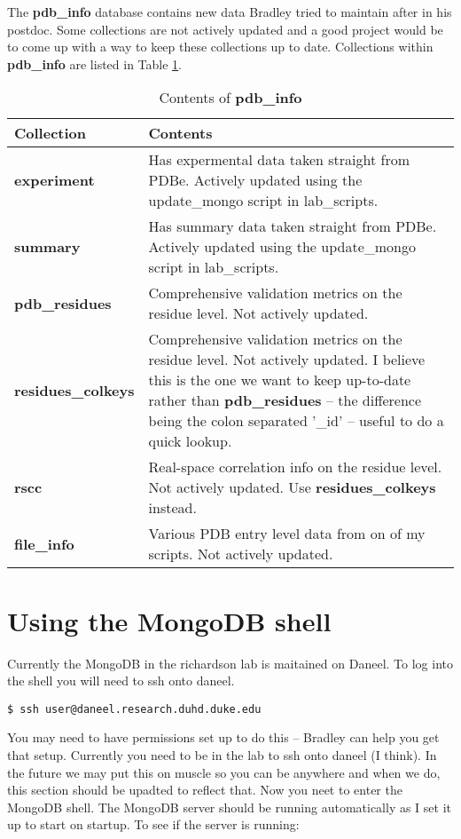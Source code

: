 \documentclass[12pt]{article}
\newcommand{\cmdline}[1]{\vspace{5mm} \noindent
\texttt{\$ #1}
\vspace{5mm}

}
\newcommand{\mdbdb}[1]{{\color{BlueViolet}\textbf{#1}}}
\newcommand{\mdbcol}[1]{{\color{Bittersweet}\textbf{#1}}}
\begin{document}
\noindent
The \mdbdb{pdb\_info} database contains new data Bradley tried to maintain after in his postdoc.
Some collections are not actively updated and a good project would be to come up with a way to keep these collections up to date.
Collections within \mdbdb{pdb\_info} are listed in Table \ref{tab:pdbinfoDB}.
\begin{table}[h]
\caption{Contents of \mdbdb{pdb\_info}}
\begin{tabular}{l|p{9cm}}
  \textbf{Collection} & \textbf{Contents} \\ \hline
  \mdbcol{experiment} & Has expermental data taken straight from PDBe. Actively updated using the update\_mongo script in lab\_scripts. \\ \hline
  \mdbcol{summary} & Has summary data taken straight from PDBe. Actively updated using the update\_mongo script in lab\_scripts. \\ \hline
   \mdbcol{pdb\_residues} & Comprehensive validation metrics on the residue level. Not actively updated. \\ \hline
   \mdbcol{residues\_colkeys} & Comprehensive validation metrics on the residue level. Not actively updated. I believe this is the one we want to keep up-to-date rather than \mdbcol{pdb\_residues} -- the difference being the colon separated '\_id' -- useful to do a quick lookup. \\ \hline
   \mdbcol{rscc} & Real-space correlation info on the residue level. Not actively updated. Use \mdbcol{residues\_colkeys} instead. \\ \hline
   \mdbcol{file\_info} & Various PDB entry level data from on of my scripts. Not actively updated. \\ \hline
\end{tabular}
\label{tab:pdbinfoDB}
\end{table}

\section{Using the MongoDB shell}
Currently the MongoDB in the richardson lab is maitained on Daneel. 
To log into the shell you will need to ssh onto daneel.

\cmdline{ssh user@daneel.research.duhd.duke.edu}
\noindent
You may need to have permissions set up to do this -- Bradley can help you get that setup.
Currently you need to be in the lab to ssh onto daneel (I think).
In the future we may put this on muscle so you can be anywhere and when we do, this section should be upadted to reflect that.
\noindent
Now you neet to enter the MongoDB shell.
The MongoDB server should be running automatically as I set it up to start on startup.
To see if the server is running:
\end{document}

